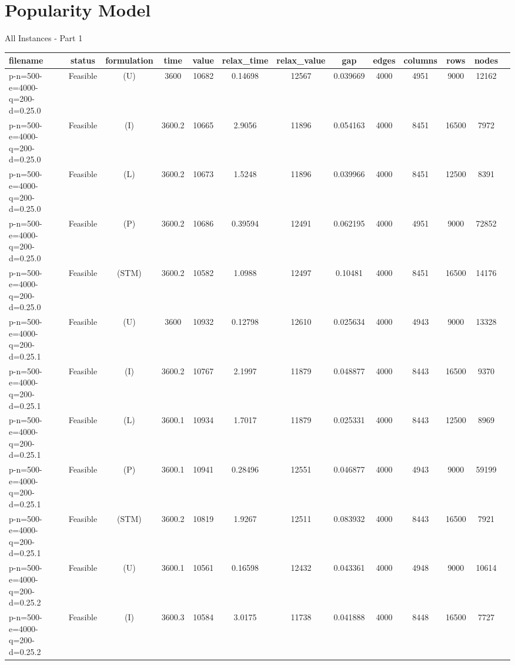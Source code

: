 \documentclass[landscape, a4paper]{article}
\newcommand{\STM}{\ensuremath{\mathrm{STM}}}
\newcommand{\Improved}{\ensuremath{\mathrm{I}}}
\newcommand{\Loose}{\ensuremath{\mathrm{L}}}
\newcommand{\Profit}{\ensuremath{\mathrm{P}}}
\newcommand{\Utility}{\ensuremath{\mathrm{U}}}
\begin{document}
\newpage
\section{Popularity Model}
\begin{center}
All Instances - Part 1

\begin{tabular}{lcccccccccccc}
filename & status & formulation & time & value & relax\_time & relax\_value & gap & edges & columns & rows & nodes & \\
\hline
p-n=500-e=4000-q=200-d=0.25.0 & Feasible & (\Utility) & 3600 & 10682 & 0.14698 & 12567 & 0.039669 & 4000 & 4951 & 9000 & 12162 & \\
p-n=500-e=4000-q=200-d=0.25.0 & Feasible & (\Improved) & 3600.2 & 10665 & 2.9056 & 11896 & 0.054163 & 4000 & 8451 & 16500 & 7972 & \\
p-n=500-e=4000-q=200-d=0.25.0 & Feasible & (\Loose) & 3600.2 & 10673 & 1.5248 & 11896 & 0.039966 & 4000 & 8451 & 12500 & 8391 & \\
p-n=500-e=4000-q=200-d=0.25.0 & Feasible & (\Profit) & 3600.2 & 10686 & 0.39594 & 12491 & 0.062195 & 4000 & 4951 & 9000 & 72852 & \\
p-n=500-e=4000-q=200-d=0.25.0 & Feasible & (\STM) & 3600.2 & 10582 & 1.0988 & 12497 & 0.10481 & 4000 & 8451 & 16500 & 14176 & \\
p-n=500-e=4000-q=200-d=0.25.1 & Feasible & (\Utility) & 3600 & 10932 & 0.12798 & 12610 & 0.025634 & 4000 & 4943 & 9000 & 13328 & \\
p-n=500-e=4000-q=200-d=0.25.1 & Feasible & (\Improved) & 3600.2 & 10767 & 2.1997 & 11879 & 0.048877 & 4000 & 8443 & 16500 & 9370 & \\
p-n=500-e=4000-q=200-d=0.25.1 & Feasible & (\Loose) & 3600.1 & 10934 & 1.7017 & 11879 & 0.025331 & 4000 & 8443 & 12500 & 8969 & \\
p-n=500-e=4000-q=200-d=0.25.1 & Feasible & (\Profit) & 3600.1 & 10941 & 0.28496 & 12551 & 0.046877 & 4000 & 4943 & 9000 & 59199 & \\
p-n=500-e=4000-q=200-d=0.25.1 & Feasible & (\STM) & 3600.2 & 10819 & 1.9267 & 12511 & 0.083932 & 4000 & 8443 & 16500 & 7921 & \\
p-n=500-e=4000-q=200-d=0.25.2 & Feasible & (\Utility) & 3600.1 & 10561 & 0.16598 & 12432 & 0.043361 & 4000 & 4948 & 9000 & 10614 & \\
p-n=500-e=4000-q=200-d=0.25.2 & Feasible & (\Improved) & 3600.3 & 10584 & 3.0175 & 11738 & 0.041888 & 4000 & 8448 & 16500 & 7727 & \\

\end{tabular}
\end{center}
\end{document}
